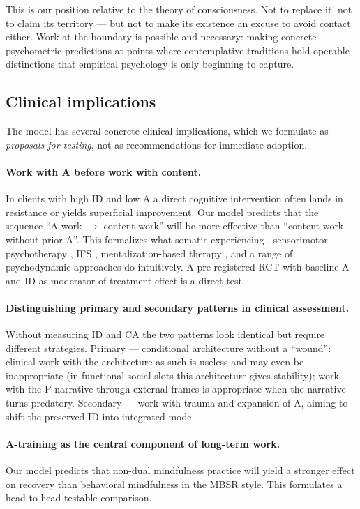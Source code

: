 This is our position relative to the theory of consciousness. Not to replace it, not to claim its territory --- but not to make its existence an excuse to avoid contact either. Work at the boundary is possible and necessary: making concrete psychometric predictions at points where contemplative traditions hold operable distinctions that empirical psychology is only beginning to capture.

\subsection{Clinical implications}
\label{subsec:clinical}

The model has several concrete clinical implications, which we formulate as \emph{proposals for testing}, not as recommendations for immediate adoption.

\paragraph{Work with A before work with content.} In clients with high ID and low A a direct cognitive intervention often lands in resistance or yields superficial improvement. Our model predicts that the sequence ``A-work $\to$ content-work'' will be more effective than ``content-work without prior A''. This formalizes what somatic experiencing \citep{levine2015}, sensorimotor psychotherapy \citep{ogden2006}, IFS \citep{schwartz1995}, mentalization-based therapy \citep{fonagy2008}, and a range of psychodynamic approaches do intuitively. A pre-registered RCT with baseline A and ID as moderator of treatment effect is a direct test.

\paragraph{Distinguishing primary and secondary patterns in clinical assessment.} Without measuring ID and CA the two patterns look identical but require different strategies. Primary --- conditional architecture without a ``wound'': clinical work with the architecture as such is useless and may even be inappropriate (in functional social slots this architecture gives stability); work with the P-narrative through external frames is appropriate when the narrative turns predatory. Secondary --- work with trauma and expansion of A, aiming to shift the preserved ID into integrated mode.

\paragraph{A-training as the central component of long-term work.} Our model predicts that non-dual mindfulness practice will yield a stronger effect on \EAF{} recovery than behavioral mindfulness in the MBSR style. This formulates a head-to-head testable comparison.

